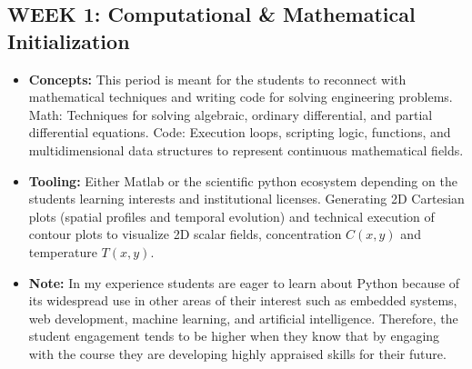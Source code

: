 \subsection{WEEK 1: Computational \& Mathematical Initialization}
\begin{itemize}
    \item \textbf{Concepts:} This period is meant for the students to reconnect with mathematical techniques and writing code for solving engineering problems. Math: Techniques for solving algebraic, ordinary differential, and partial differential equations. Code: Execution loops, scripting logic, functions, and multidimensional data structures to represent continuous mathematical fields.
    \item \textbf{Tooling:} Either Matlab or the scientific python ecosystem depending on the students learning interests and institutional licenses. Generating 2D Cartesian plots (spatial profiles and temporal evolution) and technical execution of {contour plots} to visualize 2D scalar fields, concentration $C(x,y)$ and temperature $T(x,y)$.
    \item \textbf{Note:} In my experience students are eager to learn about Python because of its widespread use in other areas of their interest such as embedded systems, web development, machine learning, and artificial intelligence. Therefore, the student engagement tends to be higher when they know that by engaging with the course they are developing highly appraised skills for their future.
\end{itemize}


